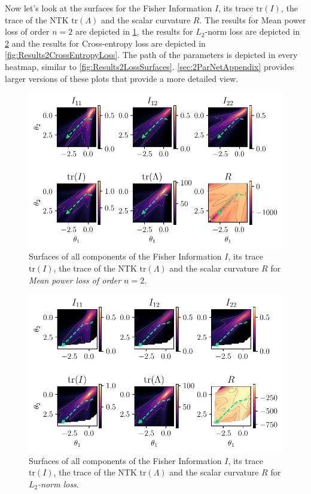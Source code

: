 Now let's look at the surfaces for the Fisher Information $I$, its trace $\mathrm{tr}(I)$, the trace of the NTK $\mathrm{tr}(\Lambda)$ and the scalar curvature $R$. The results for Mean power loss of order $n=2$ are depicted in \cref{fig:Results2MeanPowerLoss}, the results for $L_2$-norm loss are depicted in \cref{fig:Results2LPNormLoss} and the results for Cross-entropy loss are depicted in \cref{fig:Results2CrossEntropyLoss}. The path of the parameters is depicted in every heatmap, similar to \cref{fig:Results2LossSurfaces}. \cref{sec:2ParNetAppendix} provides larger versions of these plots that provide a more detailed view.\\
\begin{figure}
	\centering
	\includegraphics{Experiment2/plots/MeanPowerLoss2_tracecomparison.pdf}
	\caption{Surfaces of all components of the Fisher Information $I$, its trace $\mathrm{tr}(I)$, the trace of the NTK $\mathrm{tr}(\Lambda)$ and the scalar curvature $R$ for \emph{Mean power loss of order $n=2$}.}
	\label{fig:Results2MeanPowerLoss}
\end{figure}
\begin{figure}
	\centering
	\includegraphics{Experiment2/plots/LPNormLoss2_tracecomparison.pdf}
	\caption{Surfaces of all components of the Fisher Information $I$, its trace $\mathrm{tr}(I)$, the trace of the NTK $\mathrm{tr}(\Lambda)$ and the scalar curvature $R$ for \emph{$L_2$-norm loss}.}
	\label{fig:Results2LPNormLoss}
\end{figure}
